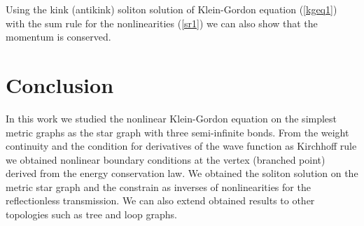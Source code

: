 \documentclass[12pt]{llncs}
\begin{document}
Using the kink (antikink) soliton solution of Klein-Gordon
equation (\ref{kgeq1}) with the sum rule for the nonlinearities
(\ref{sr1}) we can also show that the momentum is conserved.

\section{Conclusion}

In this work we studied the nonlinear Klein-Gordon equation on
the simplest metric graphs as the star graph with three
semi-infinite bonds. From the weight continuity and the condition for derivatives of the wave function as Kirchhoff rule we obtained nonlinear boundary conditions at the vertex (branched point) derived from the energy conservation law. We obtained the soliton solution on the metric star graph and the constrain as inverses of nonlinearities for the reflectionless transmission. We can also extend obtained results to other topologies such as tree and loop graphs.


\end{document}

